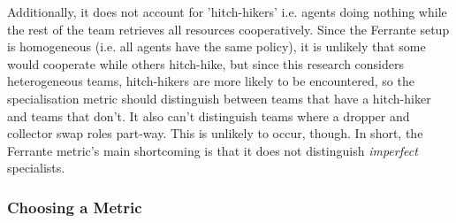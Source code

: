 \documentclass[12pt]{article}
\begin{document}
Additionally, it does not account for 'hitch-hikers' i.e. agents doing nothing while the rest of the team retrieves all resources cooperatively. Since the Ferrante setup is homogeneous (i.e. all agents have the same policy), it is unlikely that some would cooperate while others hitch-hike, but since this research considers heterogeneous teams, hitch-hikers are more likely to be encountered, so the specialisation metric should distinguish between teams that have a hitch-hiker and teams that don't. It also can't distinguish teams where a dropper and collector swap roles part-way. This is unlikely to occur, though. In short, the Ferrante metric's main shortcoming is that it does not distinguish \textit{imperfect} specialists.

\subsubsection{Choosing a Metric}
\end{document}
